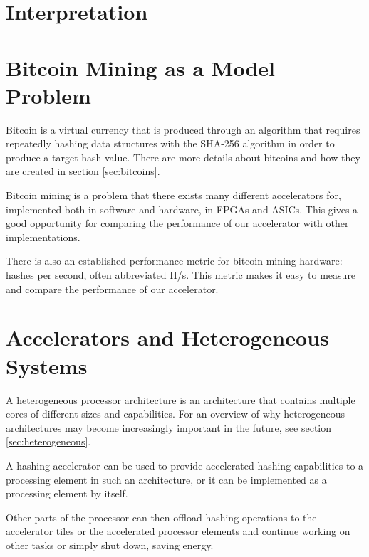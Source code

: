 \section{Interpretation}

\section{Bitcoin Mining as a Model Problem}

Bitcoin is a virtual currency that is produced through an algorithm that
requires repeatedly hashing data structures with the SHA-256 algorithm
in order to produce a target hash value. There are more details about
bitcoins and how they are created in section \ref{sec:bitcoins}.

Bitcoin mining is a problem that there exists many different accelerators
for, implemented both in software and hardware, in FPGAs and ASICs\cite{bespoke-silicon}.
This gives a good opportunity for comparing the performance of our
accelerator with other implementations.

There is also an established performance metric for bitcoin mining hardware:
hashes per second, often abbreviated H/s. This metric makes it easy
to measure and compare the performance of our accelerator.

\section{Accelerators and Heterogeneous Systems}

A heterogeneous processor architecture is an architecture that contains multiple
cores of different sizes and capabilities. For an overview of why heterogeneous
architectures may become increasingly important in the future, see section
\ref{sec:heterogeneous}.

A hashing accelerator can be used to provide accelerated hashing capabilities
to a processing element in such an architecture, or it can be implemented as
a processing element by itself.

Other parts of the processor can then offload hashing operations to the
accelerator tiles or the accelerated processor elements and continue
working on other tasks or simply shut down, saving energy.

